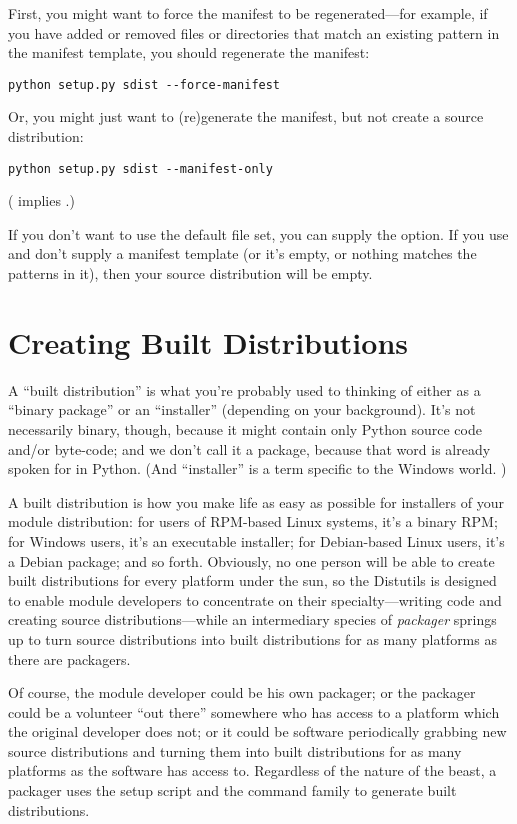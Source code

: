\documentclass{howto}
\begin{document}
First, you might want to force the manifest to be regenerated---for
example, if you have added or removed files or directories that match an
existing pattern in the manifest template, you should regenerate the
manifest:
\begin{verbatim}
python setup.py sdist --force-manifest
\end{verbatim}

Or, you might just want to (re)generate the manifest, but not create a
source distribution:
\begin{verbatim}
python setup.py sdist --manifest-only
\end{verbatim}
( implies .)

If you don't want to use the default file set, you can supply the
 option.  If you use
 and don't supply a manifest template (or
it's empty, or nothing matches the patterns in it), then your source
distribution will be empty.


\section{Creating Built Distributions}
\label{built-dist}

A ``built distribution'' is what you're probably used to thinking of
either as a ``binary package'' or an ``installer'' (depending on your
background).  It's not necessarily binary, though, because it might
contain only Python source code and/or byte-code; and we don't call it a
package, because that word is already spoken for in Python.  (And
``installer'' is a term specific to the Windows world.  )

A built distribution is how you make life as easy as possible for
installers of your module distribution: for users of RPM-based Linux
systems, it's a binary RPM; for Windows users, it's an executable
installer; for Debian-based Linux users, it's a Debian package; and so
forth.  Obviously, no one person will be able to create built
distributions for every platform under the sun, so the Distutils is
designed to enable module developers to concentrate on their
specialty---writing code and creating source distributions---while an
intermediary species of \emph{packager} springs up to turn source
distributions into built distributions for as many platforms as there
are packagers.

Of course, the module developer could be his own packager; or the
packager could be a volunteer ``out there'' somewhere who has access to
a platform which the original developer does not; or it could be
software periodically grabbing new source distributions and turning them
into built distributions for as many platforms as the software has
access to.  Regardless of the nature of the beast, a packager uses the
setup script and the  command family to generate built
distributions.
\end{document}
